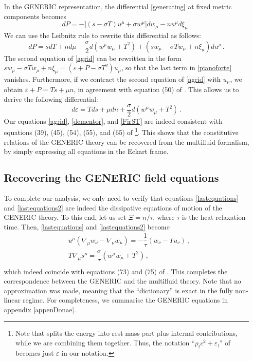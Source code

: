 \documentclass[a4paper, amsfonts, amssymb, amsmath, reprint, showkeys, nofootinbib, twoside, onecolumn, notitlepage]{revtex4-1}
\begin{document}
In the GENERIC representation, the differential \eqref{generating} at fixed metric components becomes
\begin{equation}
dP =-\big[(s-\sigma T)u^\mu +\sigma w^\mu \big]dw_\mu -nu^\mu d\xi_\mu \, .
\end{equation}
We can use the Leibnitz rule to rewrite this differential as follows:
\begin{equation}\label{pianoforte}
dP=sdT+nd\mu -\dfrac{\sigma}{2}d(w^\mu w_\mu{+}T^2) +(sw_\mu{-}\sigma T w_\mu {+}n\xi_\mu)du^\mu \, .
\end{equation}
The second equation of \eqref{agrid} can be rewritten in the form $sw_\mu -\sigma T w_\mu +n\xi_\mu =(\varepsilon{+}P{-}\sigma T^2)u_\mu$, so that the last term in \eqref{pianoforte} vanishes. Furthermore, if we contract the second equation of \eqref{agrid} with $u_\mu$, we obtain $\varepsilon+P=T s +\mu n$, in agreement with equation (50) of \cite{OttingerSoloHeat1998}. This allows us to derive the following differential:
\begin{equation}\label{FirST}
d\varepsilon = Tds+\mu dn+ \dfrac{\sigma}{2} d(w^\mu w_\mu{+}T^2) \, .
\end{equation}
Our equations \eqref{agrid}, \eqref{dementor}, and \eqref{FirST} are indeed consistent with equations (39), (45), (54), (55), and (65) of \cite{OttingerSoloHeat1998}\footnote{Note that \citet{OttingerSoloHeat1998} splits the energy into rest mass part plus internal contributions, while we are combining them together. Thus, the notation ``$\rho_{\text{f}} c^2+\varepsilon_{\text{f}}$'' of \cite{OttingerSoloHeat1998} becomes just $\varepsilon$ in our notation.}. This shows that the constitutive relations of the GENERIC theory can be recovered from the multifluid formalism, by simply expressing all equations in the Eckart frame.

\subsection{Recovering the GENERIC field equations}

To complete our analysis, we only need to verify that equations  \eqref{lastequations} and \eqref{lastequations2} are indeed the dissipative equations of motion of the GENERIC theory. To this end, let us set $\Xi=n/\tau$, where $\tau$ is the heat relaxation time. Then, \eqref{lastequations} and \eqref{lastequations2} become
\begin{equation}\label{frugale}
\begin{split}
& u^\mu (\nabla_\mu w_\nu -\nabla_\nu w_\mu)=-\dfrac{1}{\tau} (w_\nu-Tu_\nu)\, ,\\
& T\nabla_\mu s^\mu = \dfrac{\sigma}{\tau} (w^\mu w_\mu +T^2) \, , \\
\end{split}
\end{equation}
which indeed coincide with equations (73) and (75) of \cite{OttingerSoloHeat1998}. This completes the correspondence between the GENERIC and the multifluid theory. Note that no approximation was made, meaning that the ``dictionary'' is exact in the fully non-linear regime. For completeness, we summarise the GENERIC equations in appendix \ref{appenDonae}.
\end{document}
